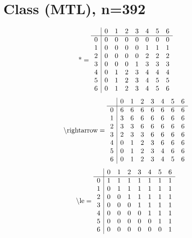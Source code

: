 \documentclass[11pt]{article}
\begin{document}
\section{Class (MTL), n=392}
\[\text{*} = 
\begin{array}{r | r r r r r r r}
 & 0 & 1 & 2 & 3 & 4 & 5 & 6 \\ \hline
0 & 0 & 0 & 0 & 0 & 0 & 0 & 0 \\
1 & 0 & 0 & 0 & 0 & 1 & 1 & 1 \\
2 & 0 & 0 & 0 & 0 & 2 & 2 & 2 \\
3 & 0 & 0 & 0 & 1 & 3 & 3 & 3 \\
4 & 0 & 1 & 2 & 3 & 4 & 4 & 4 \\
5 & 0 & 1 & 2 & 3 & 4 & 5 & 5 \\
6 & 0 & 1 & 2 & 3 & 4 & 5 & 6 \\
\end{array}
\]
\[\text{\textbackslash rightarrow} = 
\begin{array}{r | r r r r r r r}
 & 0 & 1 & 2 & 3 & 4 & 5 & 6 \\ \hline
0 & 6 & 6 & 6 & 6 & 6 & 6 & 6 \\
1 & 3 & 6 & 6 & 6 & 6 & 6 & 6 \\
2 & 3 & 3 & 6 & 6 & 6 & 6 & 6 \\
3 & 2 & 3 & 3 & 6 & 6 & 6 & 6 \\
4 & 0 & 1 & 2 & 3 & 6 & 6 & 6 \\
5 & 0 & 1 & 2 & 3 & 4 & 6 & 6 \\
6 & 0 & 1 & 2 & 3 & 4 & 5 & 6 \\
\end{array}
\]
\[\text{\textbackslash le} = 
\begin{array}{r | r r r r r r r}
 & 0 & 1 & 2 & 3 & 4 & 5 & 6 \\ \hline
0 & 1 & 1 & 1 & 1 & 1 & 1 & 1 \\
1 & 0 & 1 & 1 & 1 & 1 & 1 & 1 \\
2 & 0 & 0 & 1 & 1 & 1 & 1 & 1 \\
3 & 0 & 0 & 0 & 1 & 1 & 1 & 1 \\
4 & 0 & 0 & 0 & 0 & 1 & 1 & 1 \\
5 & 0 & 0 & 0 & 0 & 0 & 1 & 1 \\
6 & 0 & 0 & 0 & 0 & 0 & 0 & 1 \\
\end{array}
\]
\end{document}
